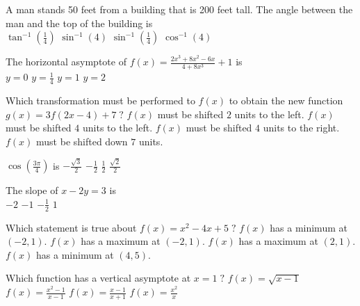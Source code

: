 \begin{question}
A man stands 50 feet from a building that is 200 feet tall. The angle between the man and the top of the building is \\
\choicesline
{}
{\(\tan^{-1} \left(\frac{1}{4}\right)\)}
{\(\sin^{-1}(4)\)}
{\(\sin^{-1} \left(\frac{1}{4}\right)\)}
{\(\cos^{-1}(4)\)}
\end{question}

\begin{question}
The horizontal asymptote of \(f(x) = \frac{2x^3 + 8x^2 - 6x}{4 + 8x^3} + 1\) is \\
\choicesline
{\(y = 0\)}
{\(y = \frac{1}{4}\)}
{\(y = 1\)}
{}
{\(y = 2\)}
\end{question}

\begin{question} 
Which transformation must be performed to \(f(x)\) to obtain the new function \(g(x) = 3f(2x - 4) + 7 \; ?\)
\choices
{\(f(x)\) must be shifted \(2\) units to the left.}
{}
{\(f(x)\) must be shifted \(4\) units to the left.}
{\(f(x)\) must be shifted \(4\) units to the right.}
{\(f(x)\) must be shifted down \(7\) units.}
\end{question}

\begin{question}
\(\cos \left(\frac{3 \pi}{4}\right)\) is 
\choicesline
{\(-\frac{\sqrt 3}{2}\)}
{}
{\(-\frac{1}{2}\)}
{\(\frac{1}{2}\)}
{\(\frac{\sqrt 2}{2}\)}
\end{question}

\begin{question}
The slope of \(x - 2y = 3\) is \\
\choicesline
{\(-2\)}
{\(-1\)}
{\(-\frac{1}{2}\)}
{}
{\(1\)}
\end{question}

\begin{question}
Which statement is true about \(f(x) = x^2 - 4x + 5 \; ?\)
\choices
{\(f(x)\) has a minimum at \((-2, 1).\)}
{\(f(x)\) has a maximum at \((-2, 1).\)}
{}
{\(f(x)\) has a maximum at \((2, 1).\)}
{\(f(x)\) has a minimum at \((4, 5).\)}
\end{question}

\begin{question}
Which function has a vertical asymptote at \(x = 1 \; ?\)
\choices
{}
{\(f(x) = \sqrt{x - 1}\)}
{\(f(x) = \frac{x^2 - 1}{x - 1}\)}
{\(f(x) = \frac{x - 1}{x + 1}\)}
{\(f(x) = \frac{x^2}{x}\)}
\end{question}

